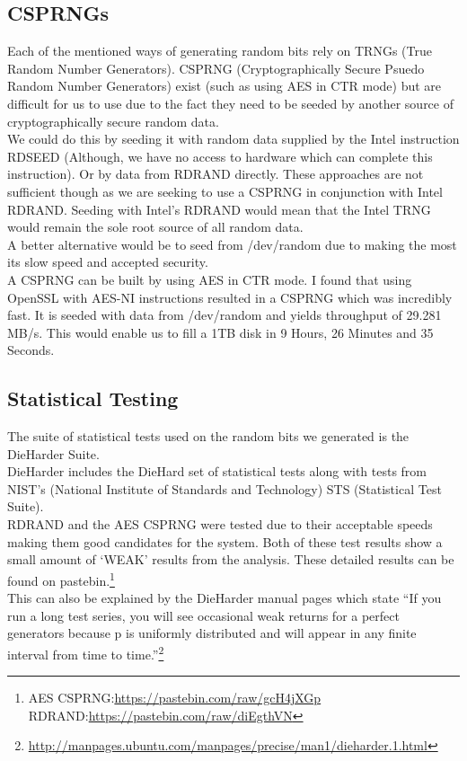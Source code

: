 \documentclass{paper}
\begin{document}
		\subsection{CSPRNGs}
			Each of the mentioned ways of generating random bits rely on TRNGs (True Random Number Generators).  CSPRNG (Cryptographically Secure Psuedo Random Number Generators) exist (such as using AES in CTR mode) but are difficult for us to use due to the fact they need 
			to be seeded by another source of cryptographically secure random data.\\ 
			We could do this by seeding it with random data supplied by the Intel instruction RDSEED (Although, we have no access to hardware which can complete this instruction). Or by data from RDRAND directly. These approaches are not sufficient though as we are seeking to use a CSPRNG in conjunction with Intel RDRAND. Seeding with Intel's RDRAND would mean that the Intel TRNG would remain 	the sole root source of all random data.\\
			A better alternative would be to seed from /dev/random due to making the most its slow speed and accepted security.\\
			
			A CSPRNG can be built by using AES in CTR mode. I found that using OpenSSL with AES-NI instructions resulted in a CSPRNG which was incredibly fast. It is seeded with data from /dev/random and yields throughput of 29.281 MB/s. This would enable us to fill a 1TB disk in 9 Hours, 26 Minutes and 35 Seconds. 
			
		\subsection{Statistical Testing}
			The suite of statistical tests used on the random bits we generated is the DieHarder Suite.\\ 
			DieHarder includes the DieHard set of statistical tests along with tests from NIST's (National Institute of Standards and Technology) STS (Statistical Test Suite).\\ 
			RDRAND and the AES CSPRNG were tested due to their acceptable speeds making them good candidates for the system. Both of these test results show a small amount of `WEAK' results from the analysis. These detailed results can be found on pastebin.\footnote{AES CSPRNG:\url{https://pastebin.com/raw/gcH4jXGp} RDRAND:\url{https://pastebin.com/raw/diEgthVN}}\\
			This can also be explained by the DieHarder manual pages which state ``If you run a long test series, you will see occasional weak returns for a perfect generators because p is uniformly distributed and will appear in any finite interval from time to time.''\footnote{\url{http://manpages.ubuntu.com/manpages/precise/man1/dieharder.1.html}}
			
\end{document}
